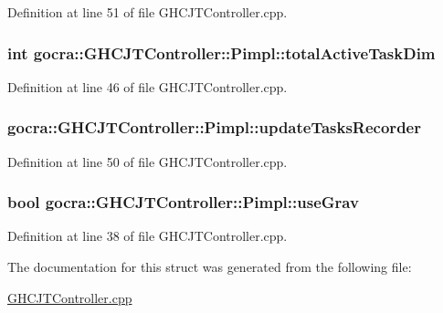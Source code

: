 Definition at line 51 of file G\+H\+C\+J\+T\+Controller.\+cpp.

\subsubsection[{\texorpdfstring{total\+Active\+Task\+Dim}{totalActiveTaskDim}}]{\setlength{\rightskip}{0pt plus 5cm}int gocra\+::\+G\+H\+C\+J\+T\+Controller\+::\+Pimpl\+::total\+Active\+Task\+Dim}\hypertarget{structgocra_1_1GHCJTController_1_1Pimpl_a9814826f2b30accde751b9f343b3590b}{}\label{structgocra_1_1GHCJTController_1_1Pimpl_a9814826f2b30accde751b9f343b3590b}


Definition at line 46 of file G\+H\+C\+J\+T\+Controller.\+cpp.

\subsubsection[{\texorpdfstring{update\+Tasks\+Recorder}{updateTasksRecorder}}]{ gocra\+::\+G\+H\+C\+J\+T\+Controller\+::\+Pimpl\+::update\+Tasks\+Recorder}\hypertarget{structgocra_1_1GHCJTController_1_1Pimpl_a7305b9fe096cfd38ba50af0797484a6a}{}\label{structgocra_1_1GHCJTController_1_1Pimpl_a7305b9fe096cfd38ba50af0797484a6a}


Definition at line 50 of file G\+H\+C\+J\+T\+Controller.\+cpp.

\subsubsection[{\texorpdfstring{use\+Grav}{useGrav}}]{\setlength{\rightskip}{0pt plus 5cm}bool gocra\+::\+G\+H\+C\+J\+T\+Controller\+::\+Pimpl\+::use\+Grav}\hypertarget{structgocra_1_1GHCJTController_1_1Pimpl_a0a9b1d16fc029929004e00dbf358063a}{}\label{structgocra_1_1GHCJTController_1_1Pimpl_a0a9b1d16fc029929004e00dbf358063a}


Definition at line 38 of file G\+H\+C\+J\+T\+Controller.\+cpp.



The documentation for this struct was generated from the following file\+:\begin{DoxyCompactItemize}
\item 
\hyperlink{GHCJTController_8cpp}{G\+H\+C\+J\+T\+Controller.\+cpp}\end{DoxyCompactItemize}
